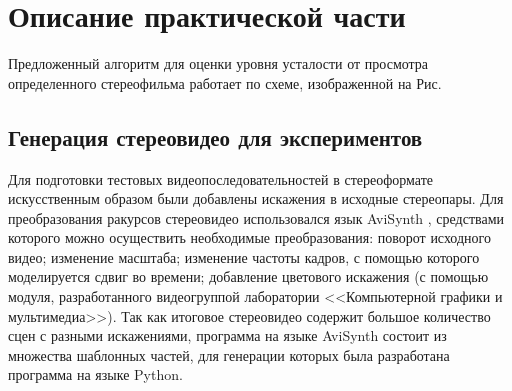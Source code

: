 \section{Описание практической части}
Предложенный алгоритм для оценки уровня усталости от просмотра определенного стереофильма работает по схеме, изображенной на Рис.
\begin{figure}[H]
\end{figure}

\subsection{Генерация стереовидео для экспериментов}
Для подготовки тестовых видеопоследовательностей в стереоформате искусственным образом были добавлены искажения в исходные стереопары. Для преобразования ракурсов стереовидео использовался язык AviSynth \cite{avisynthfaqavisynth}, средствами которого можно осуществить необходимые преобразования: поворот исходного видео; изменение масштаба; изменение частоты кадров, с помощью которого моделируется сдвиг во времени; добавление цветового искажения (с помощью модуля, разработанного видеогруппой лаборатории <<Компьютерной графики и мультимедиа>>). Так как итоговое стереовидео содержит большое количество сцен с разными искажениями, программа на языке AviSynth состоит из множества шаблонных частей, для генерации которых была разработана программа на языке Python.

